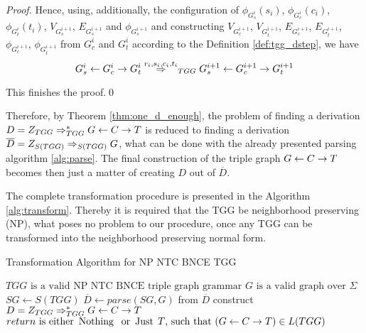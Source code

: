 \begin{proof}
	Hence, using, additionally, the configuration of $\phi_{G^i_s}(s_i)$, $\phi_{G^i_c}(c_i)$, $\phi_{G^i_t}(t_i)$, $V_{G^{i+1}_s}$, $E_{G^{i+1}_s}$ and $\phi_{G^{i+1}_s}$ and constructing $V_{G^{i+1}_c}$, $V_{G^{i+1}_t}$, $E_{G^{i+1}_c}$, $E_{G^{i+1}_t}$, $\phi_{G^{i+1}_c}$, $\phi_{G^{i+1}_t}$ from $G^i_c$ and $G^i_t$ according to the Definition \ref{def:tgg_dstep}, we have 
	\begin{equation*}
		G^i_s \ms{} G^i_c \mt{} G^i_t \tderiv{r_i}{s_i,c_i,t_i}{TGG} G^{i+1}_s \ms{} G^{i+1}_c \mt{} G^{i+1}_t
	\end{equation*}
	
	This finishes the proof.\qed
\end{proof}

Therefore, by Theorem \ref{thm:one_d_enough}, the problem of finding a derivation $D = Z_{TGG} \Rightarrow^*_{TGG} G \overset{}{\leftarrow} C \overset{}{\rightarrow} T$ is reduced to finding a derivation $\overline{D} = \startG{S(TGG)} \deriv{}{}{S(TGG)} G$, what can be done with the already presented parsing algorithm \ref{alg:parse}. The final construction of the triple graph $G \overset{}{\leftarrow} C \overset{}{\rightarrow} T$ becomes then just a matter of creating $D$ out of $\overline{D}$.


The complete transformation procedure is presented in the Algorithm \ref{alg:transform}. Thereby it is required that the TGG be neighborhood preserving (NP), what poses no problem to our procedure, once any TGG can be transformed into the neighborhood preserving normal form. 


\begin{algorithm}[!h]
	\caption{Transformation Algorithm for NP NTC BNCE TGG}
	\begin{algorithmic}[!ht]
		\Require $TGG \text{ is a valid NP NTC BNCE triple graph grammar}$
		\Require $G \text{ is a valid graph over } \Sigma$
		\State $SG \gets S(TGG)$ 
		\State $\overline{D} \gets parse(SG,G)$ 
		 
		\State from $\overline{D}$ construct $D = Z_{TGG} \Rightarrow^*_{TGG} G \overset{}{\leftarrow} C \overset{}{\rightarrow} T$
		\State {}
		\Else
		\State \Return {$\Nothing$} 
		\EndIf
		\EndFunction 
		\Ensure $return \text{ is either } \operatorname{\text{Nothing}}\; \text{ or } \operatorname{\text{Just}}\; T \text{, such that } (G \overset{}{\leftarrow} C \overset{}{\rightarrow} T) \in L(TGG)$
	\end{algorithmic}
	\label{alg:transform}
\end{algorithm}


